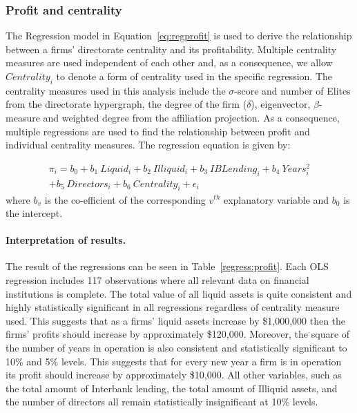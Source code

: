 \subsubsection*{Profit and centrality}

The Regression model in Equation~\ref{eq:regprofit} is used to derive the relationship between a firms' directorate centrality and its profitability. Multiple centrality measures are used independent of each other and, as a consequence, we allow $Centrality_{i}$ to denote a form of centrality used in the specific regression. The centrality measures used in this analysis include the $\sigma$-score and number of Elites from the directorate hypergraph, the degree of the firm ($\delta$), eigenvector, $\beta$-measure and weighted degree from the affiliation projection. As a consequence, multiple regressions are used to find the relationship between profit and individual centrality measures. The regression equation is given by:

\begin{multline} \label{eq:regprofit}
\pi_{i} = b_{0} + b_{1}~Liquid_{i} + b_{2}~Illiquid_{i} + b_{3}~IBLending_{i} + b_{4}~Years^{2}_{i}\\
+ b_{5}~Directors_{i} + b_{6}~Centrality_{i} + \epsilon_{i}
\end{multline}
where $b_{v}$ is the co-efficient of the corresponding $v^{th}$ explanatory variable and $b_{0}$ is the intercept.

\paragraph{Interpretation of results.}

The result of the regressions can be seen in Table~\ref{regress:profit}. Each OLS regression includes 117 observations where all relevant data on financial institutions is complete. The total value of all liquid assets is quite consistent and highly statistically significant in all regressions regardless of centrality measure used. This suggests that as a firms' liquid assets increase by \$1,000,000 then the firms' profits should increase by approximately \$120,000. Moreover, the square of the number of years in operation is also consistent and statistically significant to 10\% and 5\% levels. This suggests that for every new year a firm is in operation its profit should increase by approximately \$10,000. All other variables, such as the total amount of Interbank lending, the total amount of Illiquid assets, and the number of directors all remain statistically insignificant at 10\% levels.

